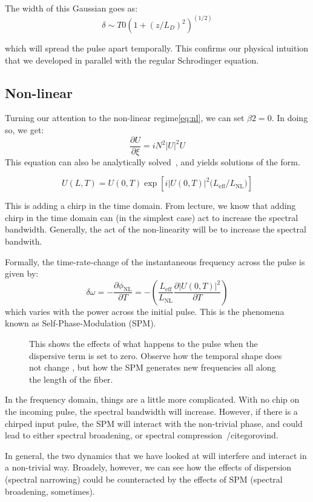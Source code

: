 \documentclass[12pt, titlepage]{article}
\renewcommand{\pd}[2]{\frac{\partial #1}{\partial #2}}
\begin{document}
\begin{spacing}{1.1}
The width of this Gaussian goes as:
\[
\delta \sim T0(1+(z/L_D)^2)^(1/2)
\]

which will spread the pulse apart temporally. This confirms our physical intuition that we developed in parallel with the regular Schrodinger equation.
\subsection{Non-linear}
Turning our attention to the non-linear regime\eqref{eq:nl}, we can set $\beta2=0$. In doing so, we get:
\[
\pd{U}{\xi}= i N^2 |U|^2U 
\]
This equation can also be analytically solved~\cite{gorovind}, and yields solutions of the form.

\[
U(L,T) = U(0,T)\exp\left[{i\left|U(0,T)\right|^2(L_\text{eff}/L_\text{NL}})\right]
\]

This is adding a chirp in the time domain. From lecture, we know that adding chirp in the time domain can (in the simplest case) act to increase the spectral bandwidth. Generally, the act of the non-linearity will be to increase the spectral bandwith.

Formally, the time-rate-change of the instantaneous frequency across the pulse is given by:
\[
\delta \omega = -\pd{\phi_\text{NL}}{T} = -\left(\frac{L_\text{eff}}{L_\text{NL}} \pd{|U(0,T)|^2}{T}\right)
\]
which varies with the power across the initial pulse.
This is the phenomena known as Self-Phase-Modulation (SPM).
\begin{figure}[h!]
 \centering
                    \caption{This shows the effects of what happens to the pulse when the
                    dispersive term is set to zero. Observe how the temporal shape does not change
                , but how the SPM generates new frequencies all along the length of the fiber.}
                    
                              \label{fig:nodisp}
                              \end{figure}


In the frequency domain, things are a little more complicated. With no chip on the incoming pulse, the spectral bandwidth will increase. However, if there is a chirped input pulse, the SPM will
interact with the non-trivial phase, and could lead to either spectral broadening, or spectral compression~/cite{gorovind}.

In general, the two dynamics that we have looked at will interfere and interact in a non-trivial way. Broadely, however, we can see how the effects of dispersion (spectral narrowing) could be counteracted by the effects of SPM (spectral broadening, sometimes).


\end{spacing}
\end{document}
